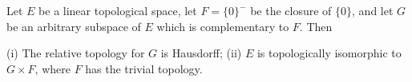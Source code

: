 Let $E$ be a linear topological space, let $F = \{0\}^{-}$ be the closure of $\{0\}$, and let $G$ be an arbitrary subspace of $E$ which is complementary to $F$. Then

(i) The relative topology for $G$ is Hausdorff;
(ii) $E$ is topologically isomorphic to $G \times F$, where $F$ has the trivial topology.
